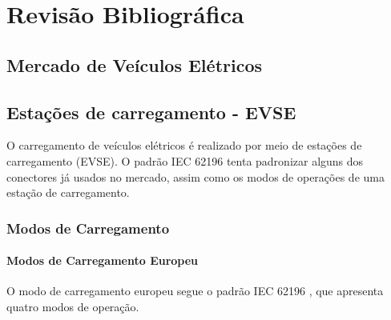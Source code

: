 \chapter{Revisão Bibliográfica}

\section{Mercado de Veículos Elétricos}

\section{Estações de carregamento - \ac{EVSE}}

O carregamento de veículos elétricos é realizado por meio de estações de carregamento (\ac{EVSE}). O padrão IEC 62196 \cite{iec-62196} tenta padronizar alguns dos conectores já usados no mercado, assim como os modos de operações de uma estação de carregamento.

\subsection{Modos de Carregamento}

\subsubsection{Modos de Carregamento Europeu}

O modo de carregamento europeu segue o padrão IEC 62196 \cite{iec-62196}, que apresenta quatro modos de operação.

